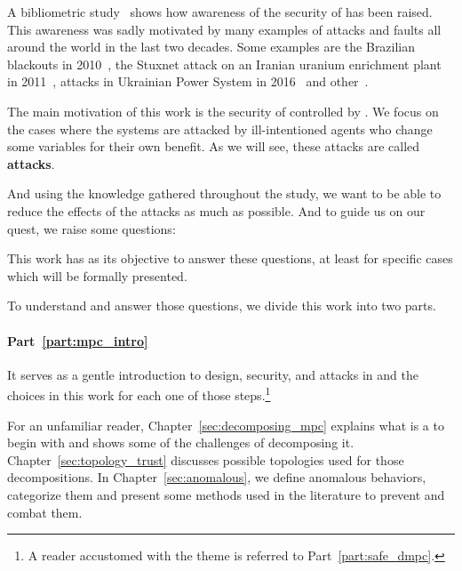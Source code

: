\documentclass[../main.tex]{subfiles}
\begin{document}
A bibliometric study~\cite{ZacchiaEtAl2019} shows how awareness of the security of \cps{} has been raised.
This awareness was sadly motivated by many examples of attacks and faults all around the world in the last two decades.
Some examples are the Brazilian blackouts in 2010~\cite{Conti2010}, the Stuxnet attack on an Iranian uranium enrichment plant in 2011~\cite{Langner2011}, attacks in Ukrainian Power System in 2016~\cite{Bindra2017} and other~\cite{DingEtAl2018,DibajiEtAl2019}.

The main motivation of this work is the security of \cps{} controlled by \dmpc{}.
We focus on the cases where the systems are attacked by ill-intentioned agents who change some variables for their own benefit.
As we will see, these attacks are called \textbf{\fdi{} attacks}.

And using the knowledge gathered throughout the study, we want to be able to reduce the effects of the attacks as much as possible.
And to guide us on our quest, we raise some questions:

This work has as its objective to answer these questions, at least for specific cases which will be formally presented.

To understand and answer those questions, we divide this work into two parts.

\paragraph{Part~\ref{part:mpc_intro}} It serves as a gentle introduction to \dmpc{} design, security, and attacks in \cps{} and the choices in this work for each one of those steps.\footnote{A reader accustomed with the theme is referred to Part~\ref{part:safe_dmpc}.}

For an unfamiliar reader, Chapter~\ref{sec:decomposing_mpc} explains what is a \mpc{} to begin with and shows some of the challenges of decomposing it.
Chapter~\ref{sec:topology_trust} discusses possible topologies used for those decompositions.
In Chapter~\ref{sec:anomalous}, we define anomalous behaviors, categorize them and present some methods used in the literature to prevent and combat them.
\end{document}
